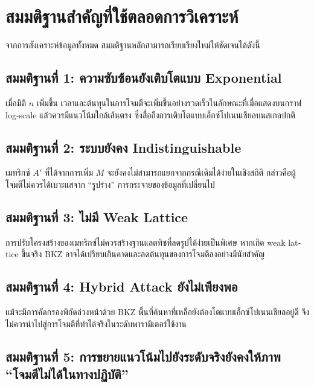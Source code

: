 \documentclass[12pt,a4paper]{article}
\newcommand{\eng}[1]{\textenglish{#1}}
\begin{document}
	\section{สมมติฐานสำคัญที่ใช้ตลอดการวิเคราะห์}
	
	จากการสังเคราะห์ข้อมูลทั้งหมด สมมติฐานหลักสามารถเรียบเรียงใหม่ให้ชัดเจนได้ดังนี้
	
	\subsection{สมมติฐานที่ 1: ความซับซ้อนยังเติบโตแบบ Exponential}
	
	เมื่อมิติ $n$ เพิ่มขึ้น เวลาและต้นทุนในการโจมตีจะเพิ่มขึ้นอย่างรวดเร็วในลักษณะที่เมื่อแสดงบนกราฟ \eng{log-scale} แล้วควรมีแนวโน้มใกล้เส้นตรง ซึ่งสื่อถึงการเติบโตแบบเอ็กซ์โปเนนเชียลบนสเกลปกติ
	
	\subsection{สมมติฐานที่ 2: ระบบยังคง Indistinguishable}
	
	เมทริกซ์ $A'$ ที่ได้จากการเพิ่ม $M$ จะยังคงไม่สามารถแยกจากกรณีเดิมได้ง่ายในเชิงสถิติ กล่าวคือผู้โจมตีไม่ควรได้เบาะแสจาก ``รูปร่าง'' การกระจายของข้อมูลที่เปลี่ยนไป
	
	\subsection{สมมติฐานที่ 3: ไม่มี Weak Lattice}
	
	การปรับโครงสร้างของเมทริกซ์ไม่ควรสร้างฐานแลตทิซที่ลดรูปได้ง่ายเป็นพิเศษ หากเกิด \eng{weak lattice} ขึ้นจริง \eng{BKZ} อาจได้เปรียบเกินคาดและลดต้นทุนของการโจมตีลงอย่างมีนัยสำคัญ
	
	\subsection{สมมติฐานที่ 4: Hybrid Attack ยังไม่เพียงพอ}
	
	แม้จะมีการคัดกรองพิกัดล่วงหน้าด้วย \eng{BKZ} พื้นที่ค้นหาที่เหลือยังต้องโตแบบเอ็กซ์โปเนนเชียลอยู่ดี จึงไม่ควรนำไปสู่การโจมตีที่ทำได้จริงในระดับพารามิเตอร์ใช้งาน
	
	\subsection{สมมติฐานที่ 5: การขยายแนวโน้มไปยังระดับจริงยังคงให้ภาพ ``โจมตีไม่ได้ในทางปฏิบัติ''}
	
\end{document}
